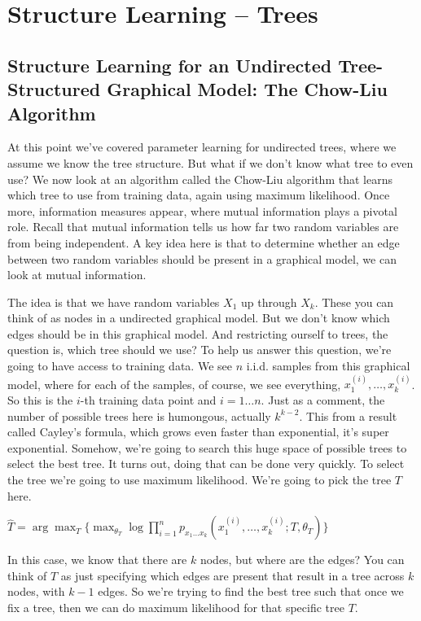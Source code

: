
\graphicspath{ {images/slt/} }

\section{Structure Learning -- Trees}

\subsection{Structure Learning for an Undirected Tree-Structured Graphical Model: The Chow-Liu Algorithm}

At this point we've covered parameter learning for undirected trees, where we assume we know the tree structure. But what if we don't know what tree to even use? We now look at an algorithm called the Chow-Liu algorithm that learns which tree to use from training data, again using maximum likelihood. Once more, information measures appear, where mutual information plays a pivotal role. Recall that mutual information tells us how far two random variables are from being independent. A key idea here is that to determine whether an edge between two random variables should be present in a graphical model, we can look at mutual information.

The idea is that we have random variables $X_1$ up through $X_k$. These you can think of as nodes in a undirected graphical model. But we don't know which edges should be in this graphical model. And restricting ourself to trees, the question is, which tree should we use? To help us answer this question, we're going to have access to training data. We see $n$ i.i.d. samples from this graphical model, where for each of the samples, of course, we see everything, $x_1^{(i)},\dots ,x_k^{(i)}$. So this is the $i$-th training data point and $i = 1 \dots n$. Just as a comment, the number of possible trees here is humongous, actually $k^{k-2}$. This from a result called Cayley's formula, which grows even faster than exponential, it's super exponential. Somehow, we're going to search this huge space of possible trees to select the best tree. It turns out, doing that can be done very quickly. To select the tree we're going to use maximum likelihood. We're going to pick the tree $T$ here. 

{\centering$\displaystyle \widehat{T}=\arg\max_{T} \bigg\{\max_{\theta_T} \log \prod_{i=1}^n p_{x_1 \dots x_k} (x_1^{(i)},\dots ,x_k^{(i)}; T, \theta_T) \bigg\}$ \par}

In this case, we know that there are $k$ nodes, but where are the edges? You can think of $T$ as just specifying which edges are present that result in a tree across $k$ nodes, with $k-1$ edges. So we're trying to find the best tree such that once we fix a tree, then we can do maximum likelihood for that specific tree $T$. 

